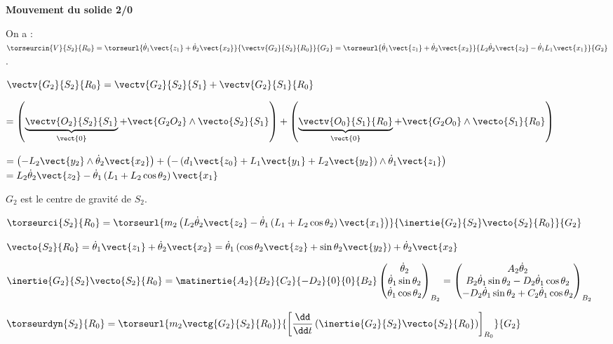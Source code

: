 \begin{multicols}{2}
\begin{corrige}
\textbf{Mouvement du solide 2/0}

On a : 
$\torseurcin{V}{S_2}{R_0}
=\torseurl{\dot{\theta}_1 \vect{z_1}+\dot{\theta}_2 \vect{x_2}}{\vectv{G_2}{S_2}{R_0}}{G_2}
=\torseurl{\dot{\theta}_1 \vect{z_1}+\dot{\theta}_2 \vect{x_2}}{
 L_2 \dot{\theta}_2 \vect{z_2}-\dot{\theta}_1L_1\vect{x_1}
}{G_2}$. 

$\vectv{G_2}{S_2}{R_0}=\vectv{G_2}{S_2}{S_1}+\vectv{G_2}{S_1}{R_0}$

$=
\left( \underbrace{\vectv{O_2}{S_2}{S_1}}_{\vect{0}}+\vect{G_2O_2}\wedge \vecto{S_2}{S_1}\right)
+ \left( \underbrace{\vectv{O_0}{S_1}{R_0}}_{\vect{0}}+\vect{G_2O_0}\wedge \vecto{S_1}{R_0}\right)$

$=
\left( -L_2\vect{y_2}\wedge \dot{\theta}_2 \vect{x_2}\right)
+ \left(-\left( d_1\vect{z_0}+L_1\vect{y_1}+L_2\vect{y_2} \right)\wedge \dot{\theta}_1 \vect{z_1}\right)$
$=
 L_2 \dot{\theta}_2 \vect{z_2}-
\dot{\theta}_1\left (L_1+L_2 \cos\theta_2 \right)\vect{x_1}
$

$G_2$ est le centre de gravité de $S_2$. 

$\torseurci{S_2}{R_0}
=\torseurl{
m_2\left(   L_2 \dot{\theta}_2 \vect{z_2}-\dot{\theta}_1\left (L_1+L_2 \cos\theta_2 \right)\vect{x_1}\right)
}{
\inertie{G_2}{S_2}\vecto{S_2}{R_0}
}{G_2}
$

$\vecto{S_2}{R_0}
=\dot{\theta}_1 \vect{z_1}+\dot{\theta}_2 \vect{x_2}
=\dot{\theta}_1 \left( \cos\theta_2 \vect{z_2}+\sin\theta_2 \vect{y_2} \right)+\dot{\theta}_2 \vect{x_2}
$

$\inertie{G_2}{S_2}\vecto{S_2}{R_0}=
\matinertie{A_2}{B_2}{C_2}{-D_2}{0}{0}{B_2}
\begin{pmatrix}
\dot{\theta}_2 \\
\dot{\theta}_1\sin\theta_2\\
\dot{\theta}_1\cos\theta_2
\end{pmatrix}_{B_2}
=
\begin{pmatrix}
A_2\dot{\theta}_2 \\
B_2\dot{\theta}_1\sin\theta_2 - D_2 \dot{\theta}_1\cos\theta_2\\
-D_2\dot{\theta}_1\sin\theta_2 +C_2 \dot{\theta}_1\cos\theta_2
\end{pmatrix}_{B_2}
$

$\torseurdyn{S_2}{R_0}
=\torseurl{
m_2 \vectg{G_2}{S_2}{R_0}
}{
\left[\dfrac{\dd}{\dd t}\left(\inertie{G_2}{S_2}\vecto{S_2}{R_0}\right)\right]_{R_0}
}{G_2}
$


\end{corrige}
\end{multicols}
